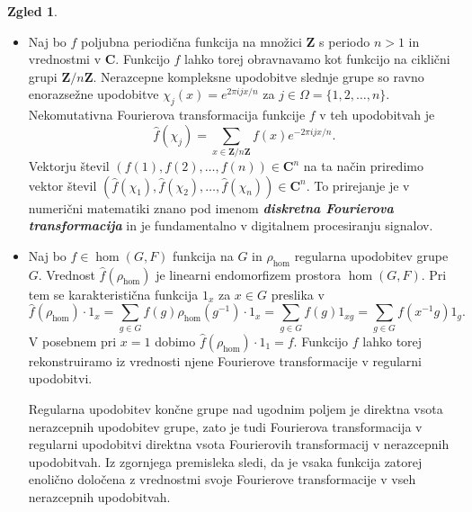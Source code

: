 \documentclass[11pt]{book}
\def\ZZ{\mathbf{Z}}
\def\CC{\mathbf{C}}
\def\definicija{\color{rdeca}\bf\em}
\theoremstyle{definition}
\theoremstyle{zgled}
\newtheorem*{zgled}{Zgled}
\theoremstyle{odprtproblem}
\theoremstyle{domacanaloga}
\theoremstyle{izrek}
\begin{document}
\begin{zgled} \leavevmode
\begin{itemize}
    \item Naj bo $f$ poljubna periodična funkcija na množici $\ZZ$ s periodo $n > 1$ in vrednostmi v $\CC$. Funkcijo $f$ lahko torej obravnavamo kot funkcijo na ciklični grupi $\ZZ/n\ZZ$. Nerazcepne kompleksne upodobitve slednje grupe so ravno enorazsežne upodobitve $\chi_j(x) = e^{2 \pi i j x / n}$ za $j \in \Omega = \{ 1, 2, \dots, n \}$. Nekomutativna Fourierova transformacija funkcije $f$ v teh upodobitvah je
    \[
        \hat{f}(\chi_j) = \sum_{x \in \ZZ/n\ZZ} f(x) e^{- 2 \pi i j x / n }.
    \]
    Vektorju števil $(f(1), f(2), \dots, f(n)) \in \CC^n$ na ta način priredimo vektor števil $(\hat{f}(\chi_1), \hat{f}(\chi_2), \dots, \hat{f}(\chi_n)) \in \CC^n$. To prirejanje je v numerični matematiki znano pod imenom {\definicija diskretna Fourierova transformacija} in je fundamentalno v digitalnem procesiranju signalov.

    \item Naj bo $f \in \hom(G,F)$ funkcija na $G$ in $\rho_{\hom}$ regularna upodobitev grupe $G$. Vrednost $\hat{f}(\rho_{\hom})$ je linearni endomorfizem prostora $\hom(G,F)$. Pri tem se karakteristična funkcija $1_x$ za $x \in G$ preslika v
\[
    \hat{f}(\rho_{\hom}) \cdot 1_x 
    = \sum_{g \in G} f(g) \rho_{\hom}(g^{-1}) \cdot 1_x
    = \sum_{g \in G} f(g) 1_{xg}
    = \sum_{g \in G} f(x^{-1}g) 1_{g}.
\] 
V posebnem pri $x = 1$ dobimo $\hat{f}(\rho_{\hom}) \cdot 1_1 = f$. Funkcijo $f$ lahko torej rekonstruiramo iz vrednosti njene Fourierove transformacije v regularni upodobitvi. 

Regularna upodobitev končne grupe nad ugodnim poljem je direktna vsota nerazcepnih upodobitev grupe, zato je tudi Fourierova transformacija v regularni upodobitvi direktna vsota Fourierovih transformacij v nerazcepnih upodobitvah. Iz zgornjega premisleka sledi, da je vsaka funkcija zatorej enolično določena z vrednostmi svoje Fourierove transformacije v vseh nerazcepnih upodobitvah.
\end{itemize}
\end{zgled}
\end{document}

